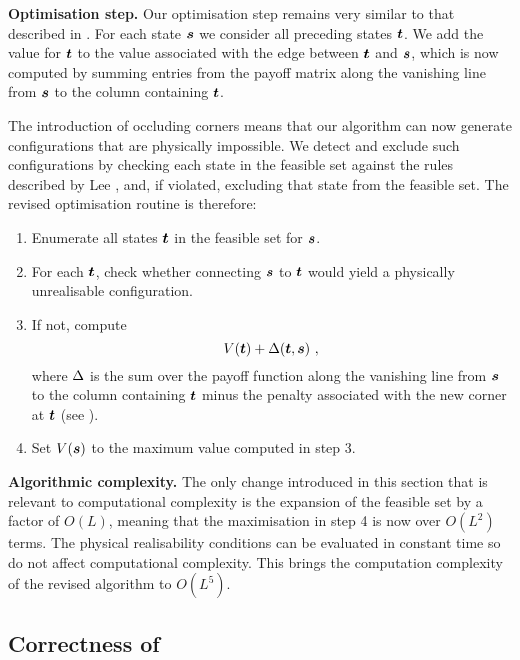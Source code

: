 \textbf{Optimisation step.} Our optimisation step remains very similar
to that described in . For each state $\State$ we
consider all preceding states $\OtherState$. We add the value for
$\OtherState$ to the value associated with the edge between
$\OtherState$ and $\State$, which is now computed by summing entries
from the payoff matrix along the vanishing line from $\State$ to the
column containing $\OtherState$.

The introduction of occluding corners means that our algorithm can now
generate configurations that are physically impossible. We detect and
exclude such configurations by checking each state in the feasible set
against the rules described by Lee \etal \cite{Lee09}, and, if
violated, excluding that state from the feasible set. The revised
optimisation routine is therefore:
\begin{enumerate}
  \item{Enumerate all states $\OtherState$ in the feasible set for
    $\State$.}
  \item{For each $\OtherState$, check whether connecting $\State$ to $\OtherState$
    would yield a physically unrealisable configuration.}
  \item{If not, compute
    \begin{equation}
      \label{eq:optimisation-step-occluding}
      \bestvalue(\OtherState)+\edgevalue(\OtherState,\State) ~,
    \end{equation}
    where $\edgevalue$ is the sum over the payoff function along the
    vanishing line from $\State$ to the column containing
    $\OtherState$ minus the penalty associated with the new corner at
    $\OtherState$ (see ).}
  \item{Set $\bestvalue(\State)$ to the maximum value computed in
    step 3.}
\end{enumerate}

\textbf{Algorithmic complexity.} The only change introduced in this
section that is relevant to computational complexity is the expansion
of the feasible set by a factor of $O(L)$, meaning that the
maximisation in step 4 is now over $O(L^2)$ terms. The physical
realisability conditions can be evaluated in constant time so do not
affect computational complexity. This brings the computation
complexity of the revised algorithm to $O(L^5)$.

\subsection{Correctness of }

